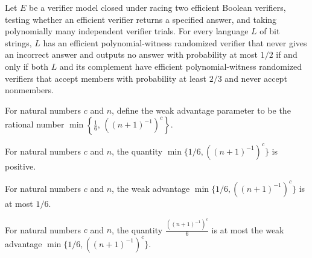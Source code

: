 \begin{theorem}
\label{Randomized.inZPP_iff_inRP_and_inCoRP}
\leanok
{}
Let $E$ be a verifier model closed under racing two efficient Boolean verifiers, testing
whether an efficient verifier returns a specified answer, and taking polynomially many
independent verifier trials. For every language $L$ of bit strings, $L$ has an efficient
polynomial-witness randomized verifier that never gives an incorrect answer and outputs
no answer with probability at most $1/2$ if and only if both $L$ and its complement have
efficient polynomial-witness randomized verifiers that accept members with probability
at least $2/3$ and never accept nonmembers.
\end{theorem}

\begin{definition}
\label{Randomized.weakAdv}
\leanok
For natural numbers $c$ and $n$, define the weak advantage parameter to be the rational
number $\min\left\{\frac{1}{6},\,((n+1)^{-1})^c\right\}$.
\end{definition}

\begin{theorem}
\label{Randomized.weakAdv_pos}
\leanok
{}
For natural numbers $c$ and $n$, the quantity $\min\{1/6,((n+1)^{-1})^c\}$ is positive.
\end{theorem}

\begin{theorem}
\label{Randomized.weakAdv_le_sixth}
\leanok
{}
For natural numbers $c$ and $n$, the weak advantage $\min\{1/6,((n+1)^{-1})^c\}$ is at
most $1/6$.
\end{theorem}

\begin{theorem}
\label{Randomized.weakAdv_ge}
\leanok
{}
For natural numbers $c$ and $n$, the quantity $\frac{((n+1)^{-1})^c}{6}$ is at most the
weak advantage $\min\{1/6,((n+1)^{-1})^c\}$.
\end{theorem}

